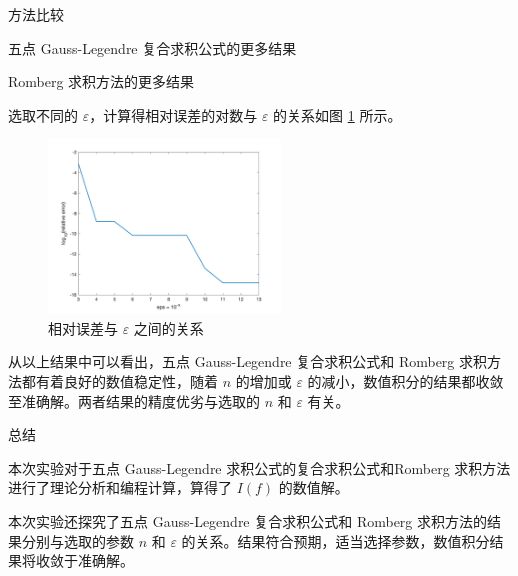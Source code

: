 \documentclass[a4paper]{article}
\begin{document}
\begin{multicols}{2}
\begin{section}{方法比较}
\begin{subsection}{五点 Gauss-Legendre 复合求积公式的更多结果}
	\end{subsection}
	
	\begin{subsection}{Romberg 求积方法的更多结果}
		
		选取不同的 $\varepsilon$，计算得相对误差的对数与 $\varepsilon$ 的关系如图 \ref{romberg} 所示。
		
		\begin{figure}[H]
			\centering
			\includegraphics[width = 0.55\textwidth]{img/romberg.png} 
			\caption{相对误差与 $\varepsilon$ 之间的关系}
			\label{romberg} 
		\end{figure}
		
		从以上结果中可以看出，五点 Gauss-Legendre 复合求积公式和 Romberg 求积方法都有着良好的数值稳定性，随着 $n$ 的增加或 $\varepsilon$ 的减小，数值积分的结果都收敛至准确解。两者结果的精度优劣与选取的 $n$ 和 $\varepsilon$ 有关。
		
	\end{subsection}
	
\end{section}
	
\begin{section}{总结}
	
	本次实验对于五点 Gauss-Legendre 求积公式的复合求积公式和Romberg 求积方法进行了理论分析和编程计算，算得了 $I(f)$ 的数值解。
	
	本次实验还探究了五点 Gauss-Legendre 复合求积公式和 Romberg 求积方法的结果分别与选取的参数 $n$ 和 $\varepsilon$ 的关系。结果符合预期，适当选择参数，数值积分结果将收敛于准确解。
	
\end{section}

\end{multicols}

%
%

\end{document}
